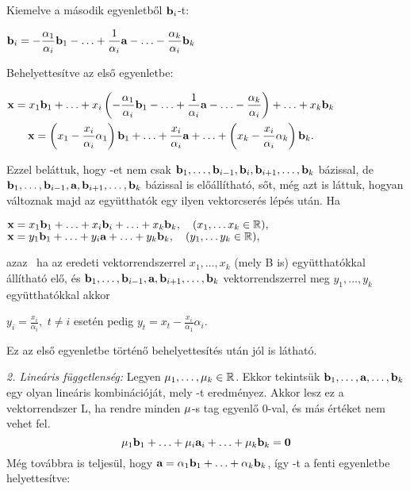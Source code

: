 \documentclass[a4paper,11.5pt]{article}
\begin{document}
	Kiemelve a második egyenletből $\textbf{b}_i$-t:
		
	\begin{center}
		$\begin{gathered}
			 \textbf{b}_i=-\frac{\alpha_1}{\alpha_i}\textbf{b}_1-\ldots+\frac{1}{\alpha_i} \textbf{a}-\ldots-\frac{\alpha_k}{\alpha_i}\textbf{b}_k
		\end{gathered}$
	\end{center}
	
	Behelyettesítve az első egyenletbe:
	
	\begin{center}
		$\begin{gathered}
			\textbf{x}=x_1\textbf{b}_1+\ldots+x_i\left(-\frac{\alpha_1}{\alpha_i}\textbf{b}_1-\ldots+\frac{1}{\alpha_i} \textbf{a}-\ldots-\frac{\alpha_k}{\alpha_i}\right)+\ldots+ x_k\textbf{b}_k\\
			\textbf{x}=\left(x_1-\frac{x_i}{\alpha_i}\alpha_1\right)\textbf{b}_1+\ldots+\frac{x_i}{\alpha_i} \textbf{a}+\ldots+\left(x_k-\frac{x_i}{\alpha_i}\alpha_k\right)\textbf{b}_k.
		\end{gathered}$
	\end{center}
	
	Ezzel beláttuk, hogy \x-et nem csak $\textbf{b}_1,\ldots,\textbf{b}_{i-1},\textbf{b}_i,\textbf{b}_{i+1},\ldots,\textbf{b}_k$ bázissal, de $\textbf{b}_1,\ldots,\textbf{b}_{i-1},\textbf{a},\textbf{b}_{i+1},\ldots,\textbf{b}_k$ bázissal is előállítható, sőt, még azt is láttuk, hogyan változnak majd az együtthatók egy ilyen vektorcserés lépés után. Ha
	\begin{center}
		$\textbf{x}=x_1\textbf{b}_1+\ldots+x_i\textbf{b}_i+\ldots+ x_k\textbf{b}_k,\quad (x_1,\ldots x_k\in\mathbb{R}),$\\
		$\textbf{x}=y_1\textbf{b}_1+\ldots+y_i\textbf{a}+\ldots+ y_k\textbf{b}_k,\quad (y_1,\ldots y_k\in\mathbb{R}),$
	\end{center}
	azaz \x\ ha az eredeti vektorrendszerrel $x_1,\ldots,x_k$ (mely B is) együtthatókkal állítható elő, és $\textbf{b}_1,\ldots,\textbf{b}_{i-1},\textbf{a},\textbf{b}_{i+1},\ldots,\textbf{b}_k$ vektorrendszerrel meg $y_1,\ldots,y_k$ együtthatókkal akkor
	\begin{center}
		$\displaystyle y_i=\frac{x_i}{\alpha_i},$ \quad $t\not=i$ esetén pedig \quad $\displaystyle y_t=x_t-\frac{x_i}{\alpha_1}\alpha_i.$
	\end{center}
	Ez az első egyenletbe történő behelyettesítés után jól is látható.
	
	\smallskip
	\emph{2. Lineáris függetlenség:} Legyen $\mu_1,\ldots,\mu_k \in \mathbb{R}$. Ekkor tekintsük $\textbf{b}_1,\ldots,\textbf{a},\ldots,\textbf{b}_k$ egy olyan lineáris kombinációját, mely \0-t eredményez. Akkor lesz ez a vektorrendszer L, ha rendre minden $\mu$-s tag egyenlő 0-val, és más értéket nem vehet fel.
	\[\mu_1\textbf{b}_1+\ldots+\mu_i\textbf{a}_i+\ldots+\mu_k\textbf{b}_k=\textbf{0}\]
	Még továbbra is teljesül, hogy $\textbf{a} = \alpha_1\textbf{b}_1+\ldots+\alpha_k\textbf{b}_k$, így \a-t a fenti egyenletbe helyettesítve:
	
\end{document}
